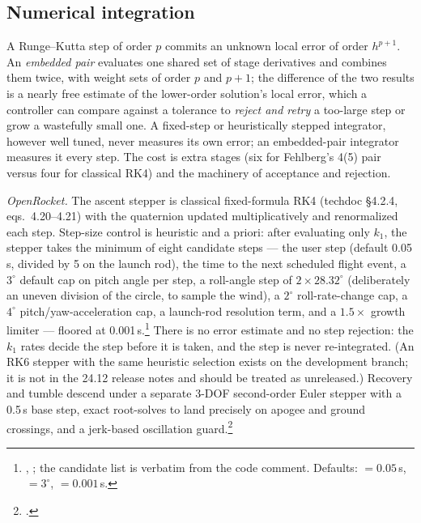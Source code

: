 \subsection{Numerical integration}\label{app:or-methods-integration}

\begin{physbox}
A Runge--Kutta step of order $p$ commits an unknown local error of order $h^{p+1}$. An
\emph{embedded pair} evaluates one shared set of stage derivatives and combines them twice,
with weight sets of order $p$ and $p+1$; the difference of the two results is a nearly free
estimate of the lower-order solution's local error, which a controller can compare against a
tolerance to \emph{reject and retry} a too-large step or grow a wastefully small one. A
fixed-step or heuristically stepped integrator, however well tuned, never measures its own
error; an embedded-pair integrator measures it every step. The cost is extra stages (six for
Fehlberg's 4(5) pair versus four for classical RK4) and the machinery of acceptance and
rejection.
\end{physbox}

\emph{OpenRocket.} The ascent stepper is classical fixed-formula RK4 (techdoc \S 4.2.4,
eqs.~4.20--4.21) with the quaternion updated multiplicatively and renormalized each step.
Step-size control is heuristic and a priori: after evaluating only $k_1$, the stepper takes
the minimum of eight candidate steps --- the user step (default 0.05\,s, divided by 5 on the
launch rod), the time to the next scheduled flight event, a $3^\circ$ default cap on pitch
angle per step, a roll-angle step of $2\times 28.32^\circ$ (deliberately an uneven division
of the circle, to sample the wind), a $2^\circ$ roll-rate-change cap, a $4^\circ$
pitch/yaw-acceleration cap, a launch-rod resolution term, and a $1.5\times$ growth limiter
--- floored at 0.001\,s.\footnote{,
; the candidate list is verbatim from the code comment. Defaults:
 $=0.05$\,s,  $=3^\circ$,
 $=0.001$\,s.} There is no error estimate and no step rejection: the
$k_1$ rates decide the step before it is taken, and the step is never re-integrated. (An RK6
stepper with the same heuristic selection exists on the development branch; it is not in the
24.12 release notes and should be treated as unreleased.) Recovery and tumble descend under
a separate 3-DOF second-order Euler stepper with a 0.5\,s base step, exact root-solves to
land precisely on apogee and ground crossings, and a jerk-based oscillation
guard.\footnote{.}

